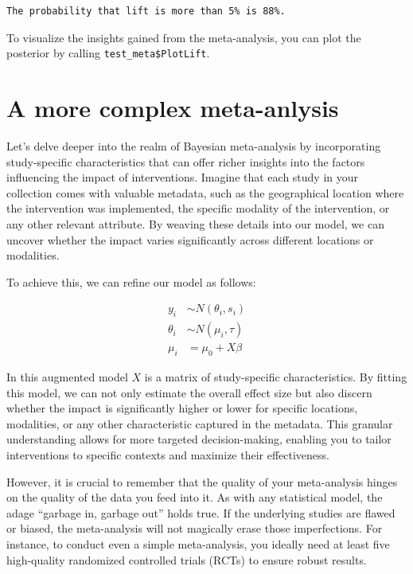 \documentclass[
  letterpaper,
  DIV=11,
  numbers=noendperiod]{scrreprt}
\begin{document}
\begin{verbatim}
The probability that lift is more than 5% is 88%.
\end{verbatim}

To visualize the insights gained from the meta-analysis, you can plot
the posterior by calling \texttt{test\_meta\$PlotLift}.

\section{A more complex meta-anlysis}\label{a-more-complex-meta-anlysis}

Let's delve deeper into the realm of Bayesian meta-analysis by
incorporating study-specific characteristics that can offer richer
insights into the factors influencing the impact of interventions.
Imagine that each study in your collection comes with valuable metadata,
such as the geographical location where the intervention was
implemented, the specific modality of the intervention, or any other
relevant attribute. By weaving these details into our model, we can
uncover whether the impact varies significantly across different
locations or modalities.

To achieve this, we can refine our model as follows:

\[
\begin{aligned}
y_i & \sim N(\theta_i,s_i)  \\
\theta_i & \sim N(\mu_i, \tau) \\
\mu_i & = \mu_0 + X\beta
\end{aligned}
\]

In this augmented model \(X\) is a matrix of study-specific
characteristics. By fitting this model, we can not only estimate the
overall effect size but also discern whether the impact is significantly
higher or lower for specific locations, modalities, or any other
characteristic captured in the metadata. This granular understanding
allows for more targeted decision-making, enabling you to tailor
interventions to specific contexts and maximize their effectiveness.

However, it is crucial to remember that the quality of your
meta-analysis hinges on the quality of the data you feed into it. As
with any statistical model, the adage ``garbage in, garbage out'' holds
true. If the underlying studies are flawed or biased, the meta-analysis
will not magically erase those imperfections. For instance, to conduct
even a simple meta-analysis, you ideally need at least five high-quality
randomized controlled trials (RCTs) to ensure robust results.
\end{document}
